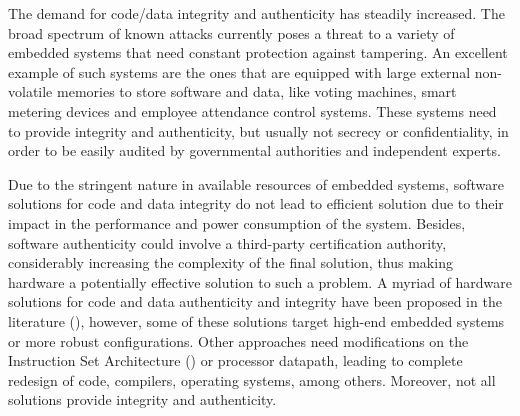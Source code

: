 
The demand for code/data integrity and authenticity has steadily increased. The broad spectrum of known attacks currently poses a threat to a variety of embedded systems that need constant protection against tampering. An excellent example of such systems are the ones that are equipped with large external non-volatile memories to store software and data, like voting machines, smart metering devices and employee attendance control systems. These systems need to provide integrity and authenticity, but usually not secrecy or confidentiality, in order to be easily audited by governmental authorities and independent experts.

Due to the stringent nature in available resources of embedded systems, software solutions for code and data integrity do not lead to efficient solution due to their impact in the performance and power consumption of the system. Besides, software authenticity could involve a third-party certification authority, considerably increasing the complexity of the final solution, thus making hardware a potentially effective solution to such a problem. A myriad of hardware solutions for code and data authenticity and integrity have been proposed in the literature (\cite{Suh2005:AEGISImplementation,Vaslin2009:OTP,Hong2010:FEDTIC,Bobade2015:SecurityFPGA}), however, some of these solutions target high-end embedded systems or more robust configurations.
Other approaches need modifications on the Instruction Set Architecture (\isa) or processor datapath, leading to complete redesign of code, compilers, operating systems, among others. Moreover, not all solutions provide integrity and authenticity.

